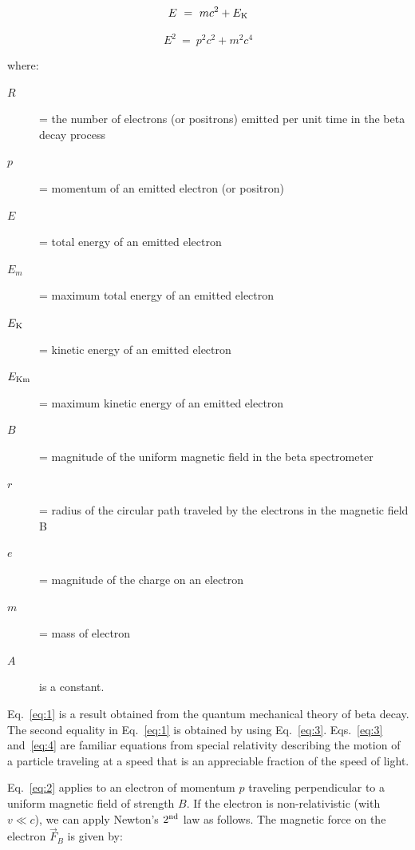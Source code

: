 \begin{equation}
E~=~mc^2 + E_{\rm K}
\label{eq:3}
\end{equation}

\begin{equation}
E^2~=~p^2c^2 + m^2c^4
\label{eq:4}
\end{equation}

where:

\begin{description}
\item[$R$] = the number of electrons (or positrons) emitted per unit time in the beta decay process

\item[$p$] = momentum of an emitted electron (or positron)

\item[$E$] = total energy of an emitted electron

\item[$E_{m}$] = maximum total energy of an emitted electron

\item[$E_{\rm K}$] = kinetic energy of an emitted electron

\item[$E_{\rm Km}$] = maximum kinetic energy of an emitted electron

\item[$B$] = magnitude of the uniform magnetic field in the beta spectrometer

\item[$r$] = radius of the circular path traveled by the electrons in the magnetic field B

\item[$e$] = magnitude of the charge on an electron

\item[$m$] = mass of electron

\item[$A$] is a constant.
\end{description}

Eq.~\ref{eq:1} is a result obtained from the quantum mechanical theory of beta
decay.  The second equality in Eq.~\ref{eq:1} is obtained by using Eq.~\ref{eq:3}.
Eqs.~\ref{eq:3} and~\ref{eq:4} are familiar equations from special relativity
describing the motion of a particle traveling at a speed that is an
appreciable fraction of the speed of light.

Eq.~\ref{eq:2} applies to an electron of momentum $p$ traveling
perpendicular to a uniform magnetic field of strength $B$.  If the
electron is non-relativistic (with $v \ll c$), we can
apply Newton's $2^{\rm nd}$
law as follows.  The magnetic force on the electron
$\vec{F}_B$ is
given by:

